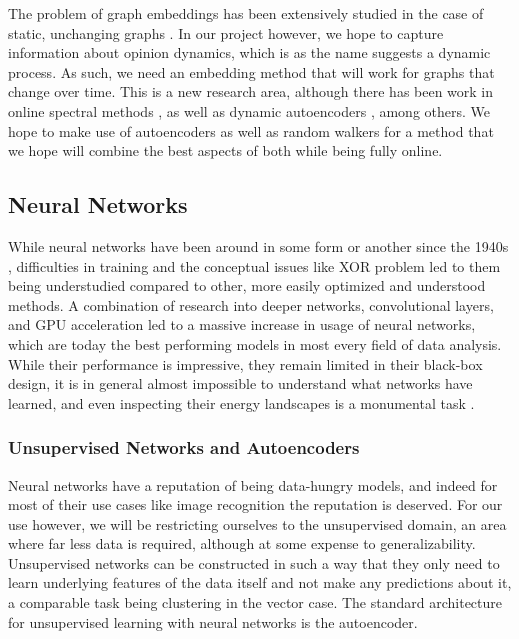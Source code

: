 \documentclass[12pt,twoside]{report}
\begin{document}
The problem of graph embeddings has been extensively studied in the case of static, unchanging graphs \cite{goyal2018graph}. In our project however, we hope to capture information about opinion dynamics, which is as the name suggests a dynamic process. As such, we need an embedding method that will work for graphs that change over time. This is a new research area, although there has been work in online spectral methods 
\cite{li2017attributed}, as well as dynamic autoencoders \cite{goyal2018dyngem}, among others. We hope to make use of autoencoders as well as random walkers for a method that we hope will combine the best aspects of both while being fully online. \\

\subsection{Neural Networks}

While neural networks have been around in some form or another since the 1940s \cite{hebb2005organization}, difficulties in training and the conceptual issues like XOR problem led to them being understudied compared to other, more easily optimized and understood methods. A combination of research into deeper networks, convolutional layers, and GPU acceleration led to a massive increase in usage of neural networks, which are today the best performing models in most every field of data analysis. While their performance is impressive, they remain limited in their black-box design, it is in general almost impossible to understand what networks have learned, and even inspecting their energy landscapes is a monumental task \cite{li2018visualizing}.

\subsubsection{Unsupervised Networks and Autoencoders}

Neural networks have a reputation of being data-hungry models, and indeed for most of their use cases like image recognition the reputation is deserved. For our use however, we will be restricting ourselves to the unsupervised domain, an area where far less data is required, although at some expense to generalizability. Unsupervised networks can be constructed in such a way that they only need to learn underlying features of the data itself and not make any predictions about it, a comparable task being clustering in the vector case. The standard architecture for unsupervised learning with neural networks is the autoencoder. 
\end{document}
